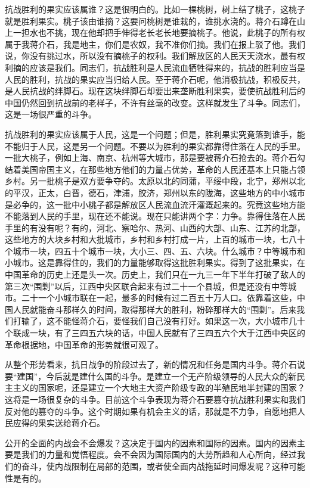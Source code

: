 抗战胜利的果实应该属谁？这是很明白的。比如一棵桃树，树上结了桃子，这桃子就是胜利果实。桃子该由谁摘？这要问桃树是谁栽的，谁挑水浇的。蒋介石蹲在山上一担水也不挑，现在他却把手伸得老长老长地要摘桃子。他说，此桃子的所有权属于我蒋介石，我是地主，你们是农奴，我不准你们摘。我们在报上驳了他。我们说，你没有挑过水，所以没有摘桃子的权利。我们解放区的人民天天浇水，最有权利摘的应该是我们。同志们，抗战胜利是人民流血牺牲得来的，抗战的胜利应当是人民的胜利，抗战的果实应当归给人民。至于蒋介石呢，他消极抗战，积极反共，是人民抗战的绊脚石。现在这块绊脚石却要出来垄断胜利果实，要使抗战胜利后的中国仍然回到抗战前的老样子，不许有丝毫的改变。这样就发生了斗争。同志们，这是一场很严重的斗争。

抗战胜利的果实应该属于人民，这是一个问题；但是，胜利果实究竟落到谁手，能不能归于人民，这是另一个问题。不要以为胜利的果实都靠得住落在人民的手里。一批大桃子，例如上海、南京、杭州等大城市，那是要被蒋介石抢去的。蒋介石勾结着美国帝国主义，在那些地方他们的力量占优势，革命的人民还基本上只能占领乡村。另一批桃子是双方要争夺的。太原以北的同蒲，平绥中段，北宁，郑州以北的平汉，正太，白晋，德石，津浦，胶济，郑州以东的陇海，这些地方的中小城市是必争的，这一批中小桃子都是解放区人民流血流汗灌溉起来的。究竟这些地方能不能落到人民的手里，现在还不能说。现在只能讲两个字：力争。靠得住落在人民手里的有没有呢？有的，河北、察哈尔、热河、山西的大部、山东、江苏的北部，这些地方的大块乡村和大批城市，乡村和乡村打成一片，上百的城市一块，七八十个城市一块，四五十个城市一块，大小三、四、五、六块。什么城市？中等城市和小城市。这是靠得住的，我们的力量能够取得这批胜利果实。得到了这批果实，在中国革命的历史上还是头一次。历史上，我们只在一九三一年下半年打破了敌人的第三次“围剿”以后，江西中央区联合起来有过二十一个县城，但是还没有中等城市。二十一个小城市联在一起，最多的时候有过二百五十万人口。依靠着这些，中国人民就能奋斗那样久的时间，取得那样大的胜利，粉碎那样大的“围剿”。后来我们打输了，这不能怪蒋介石，要怪我们自己没有打好。如果这一次，大小城市几十个联成一块，有了三四五六块的话，中国人民就有了三四五六个大于江西中央区的革命根据地，中国革命的形势就很可观了。

从整个形势看来，抗日战争的阶段过去了，新的情况和任务是国内斗争。蒋介石说要“建国”，今后就是建什么国的斗争。是建立一个无产阶级领导的人民大众的新民主主义的国家呢，还是建立一个大地主大资产阶级专政的半殖民地半封建的国家？这将是一场很复杂的斗争。目前这个斗争表现为蒋介石要篡夺抗战胜利果实和我们反对他的篡夺的斗争。这个时期如果有机会主义的话，那就是不力争，自愿地把人民应得的果实送给蒋介石。

公开的全面的内战会不会爆发？这决定于国内的因素和国际的因素。国内的因素主要是我们的力量和觉悟程度。会不会因为国际国内的大势所趋和人心所向，经过我们的奋斗，使内战限制在局部的范围，或者使全面内战拖延时间爆发呢？这种可能性是有的。

